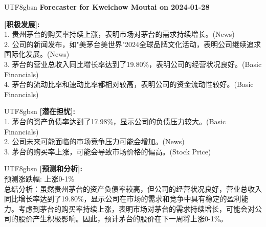 \documentclass{article}
\begin{document}
\begin{tcolorbox}[
  colback=white,
  boxrule=0.5pt,
  arc=4pt,
  left=6pt,
  right=6pt,
  top=6pt,
  bottom=6pt
]
\small
\begin{CJK}{UTF8}{gbsn}
\textbf{Forecaster for Kweichow Moutai on 2024-01-28}

\textbf{[积极发展]:}\\
1. 贵州茅台的购买率持续上涨，表明市场对茅台的需求持续增长。\textcolor{newsColor}{(News)}\\
2. 公司的新闻发布，如"美茅台美世界"2024全球品牌文化活动，表明公司继续追求国际化发展。\textcolor{newsColor}{(News)}\\
3. 茅台的营业总收入同比增长率达到了19.80\%，表明公司的经营状况良好。\textcolor{financeColor}{(Basic Financials)}\\
4. 茅台的流动比率和速动比率都相对较高，表明公司的资金流动性较好。\textcolor{financeColor}{(Basic Financials)}
\end{CJK}

\begin{CJK}{UTF8}{gbsn}
\textbf{[潜在担忧]:}\\
1. 茅台的资产负债率达到了17.98\%，显示公司的负债压力较大。\textcolor{financeColor}{(Basic Financials)}\\
2. 公司未来可能面临的市场竞争压力可能会增加。\textcolor{newsColor}{(News)}\\
3. 茅台的购买率上涨，可能会导致市场价格的偏高。\textcolor{stockPriceColor}{(Stock Price)}
\end{CJK}

\begin{CJK}{UTF8}{gbsn}
\textbf{[预测和分析]:}\\
预测涨跌幅: 上涨0-1\% \\
总结分析：虽然贵州茅台的资产负债率较高，但公司的经营状况良好，营业总收入同比增长率达到了19.80\%，显示公司在市场的需求和竞争中具有稳定的盈利能力。考虑到茅台的购买率持续上涨，表明市场对茅台的需求持续增长，可能会对公司的股价产生积极影响。因此，预计茅台的股价在下一周将上涨0-1\%。
\end{CJK}
\end{tcolorbox}
\end{document}

